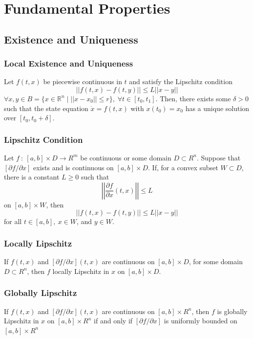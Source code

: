 \documentclass{article}
\begin{document}
\section{Fundamental Properties}
\subsection{Existence and Uniqueness}
\subsubsection{Local Existence and Uniqueness}
Let $f(t,x)$ be piecewise continuous in $t$ and satisfy the Lipschitz condition
\begin{equation*}
	||f(t,x)-f(t,y)||\leq L ||x-y||
\end{equation*}
$\forall x,y \in B = \{x \in \mathbb{R}^n\; | \; ||x-x_0|| \leq r\}, \; \forall t \in [t_0,t_1]$. Then, there exists some $\delta > 0$ such that the state equation $\dot x = f(t,x)$ with $x(t_0)=x_0$ has a unique solution over $[t_0,t_0+\delta]$.
\subsubsection{Lipschitz Condition}
Let $f \: : \: [a,b] \times D \rightarrow R^m$ be continuous or some domain $D
	\subset R^n$. Suppose that $[\partial f / \partial x]$ exists and is continuous
on $[a,b] \times D$. If, for a convex subset $W \subset D$, there is a constant
$L \geq 0$ such that
\begin{equation*}
	\left|\left|\frac{\partial f}{\partial x}(t,x)\right|\right| \leq L
\end{equation*}
on $[a,b] \times W$, then
\begin{equation*}
	||f(t,x) - f(t,y)|| \leq L||x-y||
\end{equation*}
for all $t \in [a,b], \: x \in W$, and $y \in W$.
\subsubsection{Locally Lipschitz}
If $f(t,x)$ and $[\partial f / \partial x](t,x)$ are continuous on $[a,b]
	\times D$, for some domain $D \subset R^n$, then $f$ locally Lipschitz in $x$
on $[a,b] \times D$.
\subsubsection{Globally Lipschitz}
If $f(t,x)$ and $[\partial f / \partial x](t,x)$ are continuous on $[a,b]
	\times R^n$, then $f$ is globally Lipschitz in $x$ on $[a,b] \times R^n$ if and
only if $[\partial f / \partial x]$ is uniformly bounded on $[a,b] \times R^n$
\end{document}
